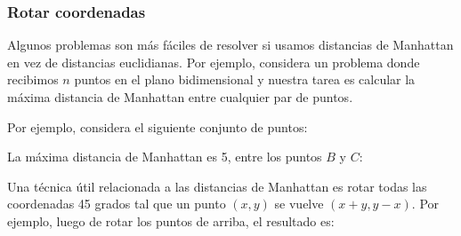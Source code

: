 \subsubsection{Rotar coordenadas}

Algunos problemas son más fáciles de resolver si usamos distancias de
Manhattan en vez de distancias euclidianas. Por ejemplo, considera un problema
donde recibimos $n$ puntos en el plano bidimensional y nuestra tarea es
calcular la máxima distancia de Manhattan entre cualquier par de puntos.

Por ejemplo, considera el siguiente conjunto de puntos:
\begin{center}
\end{center}
\pagebreak
La máxima distancia de Manhattan es 5, entre los puntos $B$ y $C$:
\begin{center}
\end{center}

Una técnica útil relacionada a las distancias de Manhattan es rotar todas
las coordenadas 45 grados tal que un punto $(x,y)$ se vuelve $(x+y,y-x)$.
Por ejemplo, luego de rotar los puntos de arriba, el resultado es:

